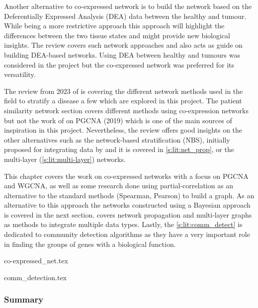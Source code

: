 Another alternative to co-expressed network is to build the network based on the Deferentially Expressed Analysis (DEA) data between the healthy and tumour. While being a more restrictive approach this approach will highlight the differences between the two tissue states and might provide new biological insights. The review \citet{Van_Dam2018-id} covers such network approaches and also acts as guide on building DEA-based networks. Using DEA between healthy and tumours was considered in the project but the co-expressed network was preferred for its versatility.

The review from 2023 of \citet{Petti2023-qo} is covering the different network methods used in the field to stratify a disease a few which are explored in this project. The patient similarity network section covers different methods using co-expression networks but not the work of \citet{Care2019-ij} on PGCNA (2019) which is one of the main sources of inspiration in this project. Nevertheless, the review offers good insights on the other alternatives such as the network-based stratification (NBS), initially proposed for integrating data by \citet{Hofree2013-ld} and it is covered in \cref{s:lit:net_prop}, or the multi-layer (\cref{s:lit:multi-layer}) networks.

This chapter covers the work on co-expressed networks with a focus on PGCNA and WGCNA, as well as some research done using partial-correlation as an alternative to the standard methods (Spearman, Pearson) to build a graph. As an alternative to this approach the networks constructed using a Bayesian approach is covered in the next section.  covers network propagation and multi-layer graphs as methods to integrate multiple data types. Lastly, the \cref{s:lit:comm_detect} is dedicated to community detection algorithms as they have a very important role in finding the groups of genes with a biological function.

{co-expressed_net.tex}

{comm_detection.tex}


\subsubsection{Summary} 



